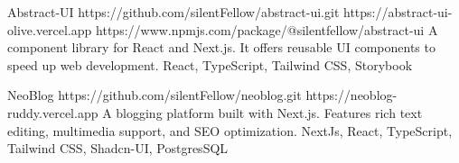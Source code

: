 \begin{tcolorbox}
\begin{minipage}[t]{0.7\textwidth}
\begin{tcolorbox}[grow to right by=0.75cm,height=0.8\textheight,colframe=white,colback=white]
\divider

\cvproject
  {Abstract-UI}
  {https://github.com/silentFellow/abstract-ui.git}
  {https://abstract-ui-olive.vercel.app}
  {https://www.npmjs.com/package/@silentfellow/abstract-ui}
  {A component library for React and Next.js. It offers reusable UI components to speed up web development.}
  {React, TypeScript, Tailwind CSS, Storybook}

\divider

\cvproject
  {NeoBlog}
  {https://github.com/silentFellow/neoblog.git}
  {https://neoblog-ruddy.vercel.app}
  {}
  {A blogging platform built with Next.js. Features rich text editing, multimedia support, and SEO optimization.}
  {NextJs, React, TypeScript, Tailwind CSS, Shadcn-UI, PostgresSQL}

                    \divider

            \end{tcolorbox}
        \end{minipage}
    \end{tcolorbox}


